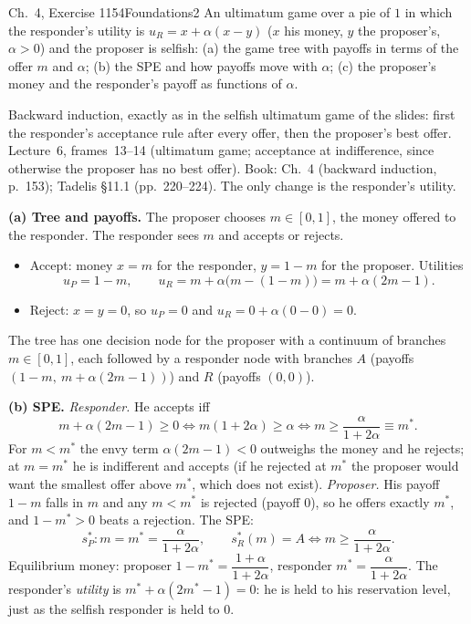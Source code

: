 \begin{exsol}{\MG{} Ch.~4, Exercise 1}{154}{Foundations}{2}
\asked An ultimatum game over a pie of $1$ in which the responder's utility is
$u_R = x + \alpha(x - y)$ ($x$ his money, $y$ the proposer's, $\alpha > 0$) and the proposer is
selfish: (a) the game tree with payoffs in terms of the offer $m$ and $\alpha$; (b) the SPE and how
payoffs move with $\alpha$; (c) the proposer's money and the responder's payoff as functions of
$\alpha$.

\method Backward induction, exactly as in the selfish ultimatum game of the slides: first the
responder's acceptance rule after every offer, then the proposer's best offer. Lecture~6,
frames~13--14 (ultimatum game; acceptance at indifference, since otherwise the proposer has no best
offer). Book: \MG{} Ch.~4 (backward induction, p.~153); Tadelis \S11.1 (pp.~220--224). The only
change is the responder's utility.

\solution
\textbf{(a) Tree and payoffs.} The proposer chooses $m \in [0,1]$, the money offered to the
responder. The responder sees $m$ and accepts or rejects.
\begin{itemize}
  \item Accept: money $x = m$ for the responder, $y = 1 - m$ for the proposer. Utilities
  \[
    u_P = 1 - m, \qquad u_R = m + \alpha\bigl(m - (1 - m)\bigr) = m + \alpha(2m - 1).
  \]
  \item Reject: $x = y = 0$, so $u_P = 0$ and $u_R = 0 + \alpha(0 - 0) = 0$.
\end{itemize}
The tree has one decision node for the proposer with a continuum of branches $m \in [0,1]$, each
followed by a responder node with branches $A$ (payoffs $(1-m,\ m + \alpha(2m-1))$) and $R$
(payoffs $(0,0)$).

\textbf{(b) SPE.} \emph{Responder.} He accepts iff
\[
  m + \alpha(2m - 1) \ge 0 \iff m(1 + 2\alpha) \ge \alpha \iff m \ge \frac{\alpha}{1 + 2\alpha}
  \equiv m^* .
\]
For $m < m^*$ the envy term $\alpha(2m-1) < 0$ outweighs the money and he rejects; at $m = m^*$ he is
indifferent and accepts (if he rejected at $m^*$ the proposer would want the smallest offer above
$m^*$, which does not exist).
\emph{Proposer.} His payoff $1 - m$ falls in $m$ and any $m < m^*$ is rejected (payoff $0$), so he
offers exactly $m^*$, and $1 - m^* > 0$ beats a rejection. The SPE:
\[
  s_P^* : m = m^* = \frac{\alpha}{1+2\alpha}, \qquad
  s_R^*(m) = A \iff m \ge \frac{\alpha}{1+2\alpha}.
\]
Equilibrium money: proposer $1 - m^* = \dfrac{1+\alpha}{1+2\alpha}$, responder $m^* =
\dfrac{\alpha}{1+2\alpha}$. The responder's \emph{utility} is $m^* + \alpha(2m^* - 1) = 0$: he is held
to his reservation level, just as the selfish responder is held to $0$.


\end{exsol}

